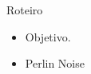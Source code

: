 \begin{frame}{Roteiro}
  \begin{itemize} \setlength\itemsep{1em}
    \item Objetivo.
    \item Perlin Noise
\end{itemize}
\end{frame}